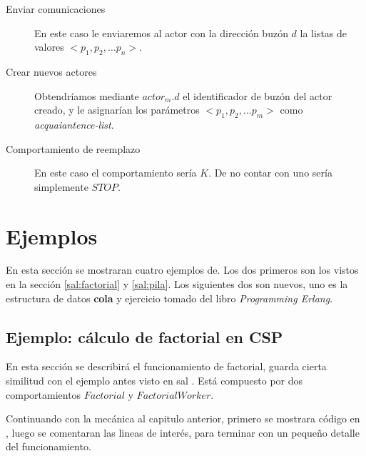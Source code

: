 \begin{description}
\item [Enviar comunicaciones] En este caso le enviaremos al actor con la dirección buzón $d$ la listas de valores $<p_1, p_2, \ldots p_n>$. 
\item [Crear nuevos actores] Obtendríamos mediante $actor_m.d$ el identificador de buzón del actor creado, y le asignarían los parámetros $<p_1, p_2, \ldots p_m>$ como \textit{acquaiantence-list}.
\item [Comportamiento de reemplazo] En este caso el comportamiento sería $K$. De no contar con uno sería simplemente $STOP$.
\end{description}

\section{Ejemplos}

En esta sección se mostraran cuatro ejemplos de. Los dos primeros son los vistos en la sección \ref{sal:factorial} y \ref{sal:pila}. Los siguientes dos son nuevos, uno es la estructura de datos \textbf{cola} y ejercicio tomado del libro \textit{Programming Erlang}\cite{Cesarini:2009:EP:1717841}.

\subsection{Ejemplo: cálculo de factorial en CSP}
En esta sección se describirá el funcionamiento de factorial, guarda cierta similitud con el ejemplo antes visto en sal \SAL. Está compuesto por dos comportamientos $Factorial$ y $FactorialWorker$.

Continuando con la mecánica al capitulo anterior, primero se mostrara código en \CSP, luego se comentaran las lineas de interés, para terminar con un pequeño detalle del funcionamiento.

